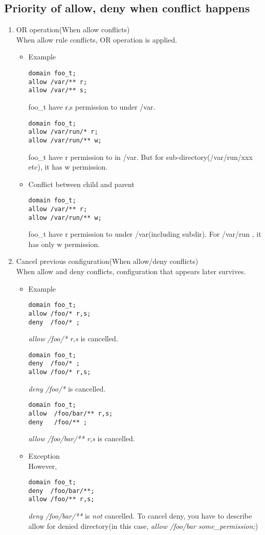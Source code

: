 \documentclass{article}
\begin{document}
\subsection{Priority of allow, deny when conflict happens}
 \begin{enumerate}
  \item OR operation(When allow conflicts) \\
	When allow rule conflicts, 
	OR operation is applied.\\
	\begin{itemize}
	 \item Example
	       \begin{verbatim}
domain foo_t;
allow /var/** r;
allow /var/** s;
	       \end{verbatim}
foo\_t have r,s permission to under /var.
	       \begin{verbatim}
domain foo_t;
allow /var/run/* r;
allow /var/run/** w;
	       \end{verbatim}
foo\_t have r permission to in /var.
But for sub-directory(/var/run/xxx etc), it has w permission.

  \item Conflict between child and parent
	       \begin{verbatim}
domain foo_t;
allow /var/** r;
allow /var/run/** w;
	       \end{verbatim}

foo\_t have r permission to under /var(including subdir).
For /var/run , it has only w permission.
	\end{itemize}

  \item Cancel previous configuration(When allow/deny conflicts)\\
	When allow and deny conflicts, 
configuration that appears later survives.
       \begin{itemize}
	  \item Example
		\begin{verbatim}
domain foo_t;
allow /foo/* r,s;
deny  /foo/* ;
		\end{verbatim}
		{\it allow /foo/* r,s} is cancelled.
		\begin{verbatim}
domain foo_t;
deny  /foo/* ;
allow /foo/* r,s;
		\end{verbatim}
		{\it deny /foo/* } is cancelled.

		\begin{verbatim}
domain foo_t;
allow  /foo/bar/** r,s;
deny   /foo/** ;
		\end{verbatim}
		{\it allow /foo/bar/** r,s} is cancelled.

	\item Exception\\
		However,		
		\begin{verbatim}
domain foo_t;
deny  /foo/bar/**;
allow /foo/** r,s;
		\end{verbatim}
		{\it deny /foo/bar/**}  is {\it not} cancelled. To
		cancel deny, you have to describe allow for denied
		directory(in this case, {\it allow /foo/bar some\_permission;})
       \end{itemize}
 \end{enumerate}
\end{document}
